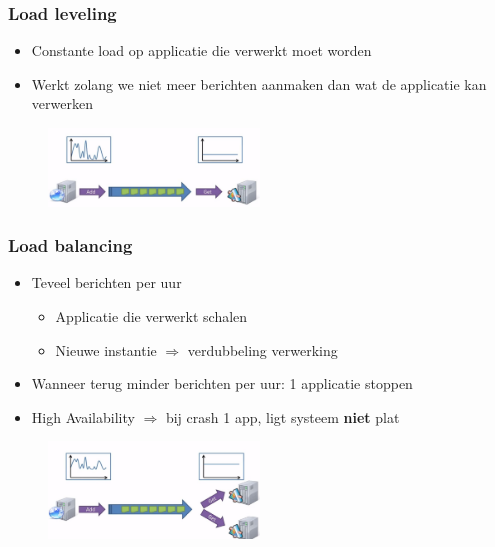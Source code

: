 \documentclass{article}
\newcommand{\bold}[1]{\textbf{#1}}
\begin{document}
\subsubsection{Load leveling}

\begin{itemize}
    \item Constante load op applicatie die verwerkt moet worden
    \item Werkt zolang we niet meer berichten aanmaken dan wat de applicatie kan verwerken
\end{itemize}

\begin{figure}[H]
    \centering
    \includegraphics[width=0.5\textwidth]{load-leveling.png}
    \caption{}
\end{figure}

\subsubsection{Load balancing}

\begin{itemize}
    \item Teveel berichten per uur
    \begin{itemize}
        \item Applicatie die verwerkt schalen
        \item Nieuwe instantie $\Rightarrow$ verdubbeling verwerking
    \end{itemize}
    \item Wanneer terug minder berichten per uur: 1 applicatie stoppen
    \item High Availability $\Rightarrow$ bij crash 1 app, ligt systeem \bold{niet} plat
\end{itemize}

\begin{figure}[H]
    \centering
    \includegraphics[width=0.5\textwidth]{load-balancing.png}
    \caption{}
\end{figure}
\end{document}
